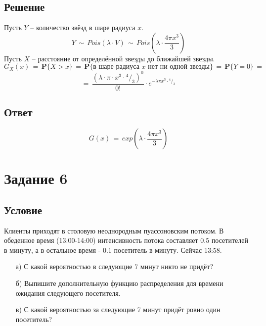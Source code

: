 \documentclass{article}
\newcommand*\rfrac[2]{{}^{#1}\!/_{#2}}
\begin{document}
\subsection*{Решение}
Пусть $ Y $ -- количество звёзд в шаре радиуса $ x $.
\[ Y \, \sim \, Pois \left( \lambda \! \cdot V \right) \, \sim \, Pois \left( \lambda \! \cdot \dfrac{4 \pi x^3}{3} \right) \]
Пусть $ X $ -- расстояние от определённой звезды до ближайшей звезды.
\[ G_X(x) \, = \, \mathbf{P} \big\{ X \! > \! x \big\} \, = \, \mathbf{P} \big\{ \text{в шаре радиуса } x \text{ нет ни одной звезды} \big\} \, = \, \mathbf{P} \big\{ Y \! = \! 0 \big\} \, = \]
\[ = \, \dfrac{{\left( \lambda \! \cdot \! \pi \! \cdot \! x^3 \! \cdot \! \rfrac{4}{3} \right)}^0}{0!} \! \cdot \! e^{-\lambda \pi x^3 \cdot \rfrac{4}{3}} \]
\subsection*{Ответ}
\[ G(x) \, = \, exp \left( \lambda \! \cdot \! \dfrac{4 \pi x^3}{3} \right) \]
\section*{Задание 6}
\subsection*{Условие}
Клиенты приходят в столовую неоднородным пуассоновским потоком. В обеденное время (13:00-14:00) интенсивность потока составляет $ 0.5 $ посетителей в минуту, а в остальное время - $ 0.1 $ посетитель в минуту. Сейчас 13:58. 
\begin{enumerate}
\item[а)] С какой вероятностью в следующие $ 7 $ минут никто не придёт?
\item[б)] Выпишите дополнительную функцию распределения для времени ожидания следующего посетителя.
\item[в)] С какой вероятностью за следующие 7 минут придёт ровно один посетитель?
\end{enumerate}
\end{document}

